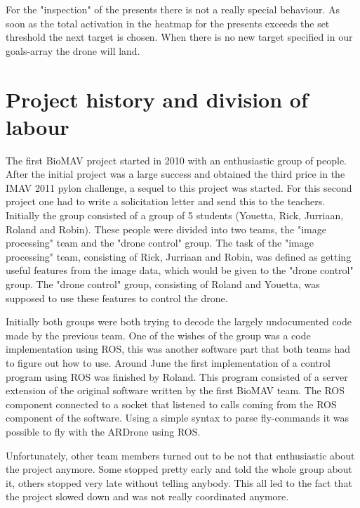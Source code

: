 \documentclass[a4paper,10pt]{article}
\begin{document}
For the "inspection" of the presents there is not a really special behaviour. 
As soon as the total activation in the heatmap for the presents exceeds the set threshold the next target is chosen. 
When there is no new target specified in our goals-array the drone will land. 

\section{Project history and division of labour}
The first BioMAV project started in 2010 with an enthusiastic group of people.
After the initial project was a large success and obtained the third price in the IMAV 2011 pylon challenge, a sequel to this project was started.
For this second project one had to write a solicitation letter and send this to the teachers. 
Initially the group consisted of a group of 5 students (Youetta, Rick, Jurriaan, Roland and Robin).  
These people were divided into two teams, the "image processing" team and the "drone control" group. 
The task of the "image processing" team, consisting of Rick, Jurriaan and Robin, was defined as getting useful features from the image data, which would be given to the "drone control" group.
The "drone control" group, consisting of Roland and Youetta, was supposed to use these features to control the drone. 

Initially both groups were both trying to decode the largely undocumented code made by the previous team.
One of the wishes of the group was a code implementation using ROS, this was another software part that both teams had to figure out how to use. 
Around June the first implementation of a control program using ROS was finished by Roland. 
This program consisted of a server extension of the original software written by the first BioMAV team.  
The ROS component connected to a socket that listened to calls coming from the ROS component of the software. 
Using a simple syntax to parse fly-commands it was possible to fly with the ARDrone using ROS.  

Unfortunately, other team members turned out to be not that enthusiastic about the project anymore. 
Some stopped pretty early and told the whole group about it, others stopped very late without telling anybody.
This all led to the fact that the project slowed down and was not really coordinated anymore. 
\end{document}
